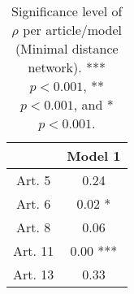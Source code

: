 \begin{table}[ht]
\centering
\begin{tabular}{cc}
  \toprule
 & Model 1 \\ 
  \midrule
Art. 5 & 0.24   \\ 
   \midrule
Art. 6 & 0.02 * \\ 
   \midrule
Art. 8 & 0.06   \\ 
   \midrule
Art. 11 & 0.00 *** \\ 
   \midrule
Art. 13 & 0.33   \\ 
   \bottomrule
\end{tabular}
\caption{Significance level of $\rho$ per article/model (Minimal distance network). *** $p < 0.001$, ** $p < 0.001$, and * $p < 0.001$.} 
\end{table}
